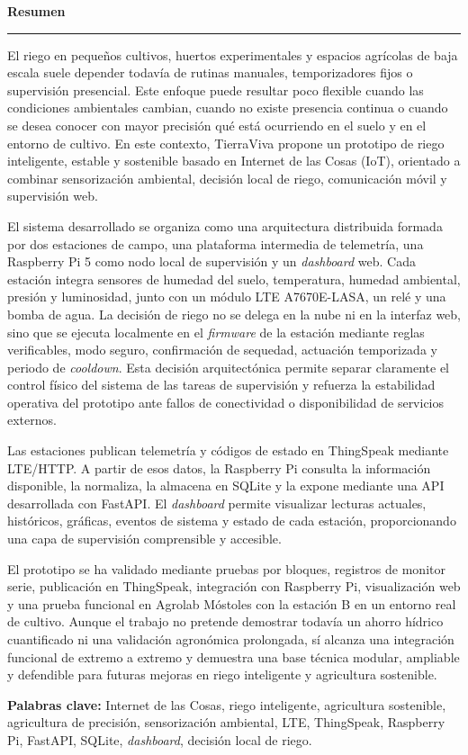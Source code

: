 \cleardoublepage
{}

\vspace*{-2.2cm}

{\noindent\Huge\bfseries Resumen\par}
\vspace{0.05cm}
\noindent\rule{\textwidth}{1pt}

\vspace{0.4cm}

El riego en pequeños cultivos, huertos experimentales y espacios agrícolas de baja escala suele depender todavía de rutinas manuales, temporizadores fijos o supervisión presencial. Este enfoque puede resultar poco flexible cuando las condiciones ambientales cambian, cuando no existe presencia continua o cuando se desea conocer con mayor precisión qué está ocurriendo en el suelo y en el entorno de cultivo. En este contexto, TierraViva propone un prototipo de riego inteligente, estable y sostenible basado en Internet de las Cosas (IoT), orientado a combinar sensorización ambiental, decisión local de riego, comunicación móvil y supervisión web.

El sistema desarrollado se organiza como una arquitectura distribuida formada por dos estaciones de campo, una plataforma intermedia de telemetría, una Raspberry Pi 5 como nodo local de supervisión y un \textit{dashboard} web. Cada estación integra sensores de humedad del suelo, temperatura, humedad ambiental, presión y luminosidad, junto con un módulo LTE A7670E-LASA, un relé y una bomba de agua. La decisión de riego no se delega en la nube ni en la interfaz web, sino que se ejecuta localmente en el \textit{firmware} de la estación mediante reglas verificables, modo seguro, confirmación de sequedad, actuación temporizada y periodo de \textit{cooldown}. Esta decisión arquitectónica permite separar claramente el control físico del sistema de las tareas de supervisión y refuerza la estabilidad operativa del prototipo ante fallos de conectividad o disponibilidad de servicios externos.

Las estaciones publican telemetría y códigos de estado en ThingSpeak mediante LTE/HTTP. A partir de esos datos, la Raspberry Pi consulta la información disponible, la normaliza, la almacena en SQLite y la expone mediante una API desarrollada con FastAPI. El \textit{dashboard} permite visualizar lecturas actuales, históricos, gráficas, eventos de sistema y estado de cada estación, proporcionando una capa de supervisión comprensible y accesible.

El prototipo se ha validado mediante pruebas por bloques, registros de monitor serie, publicación en ThingSpeak, integración con Raspberry Pi, visualización web y una prueba funcional en Agrolab Móstoles con la estación B en un entorno real de cultivo. Aunque el trabajo no pretende demostrar todavía un ahorro hídrico cuantificado ni una validación agronómica prolongada, sí alcanza una integración funcional de extremo a extremo y demuestra una base técnica modular, ampliable y defendible para futuras mejoras en riego inteligente y agricultura sostenible.

\textbf{Palabras clave:} Internet de las Cosas, riego inteligente, agricultura sostenible, agricultura de precisión, sensorización ambiental, LTE, ThingSpeak, Raspberry Pi, FastAPI, SQLite, \textit{dashboard}, decisión local de riego.
